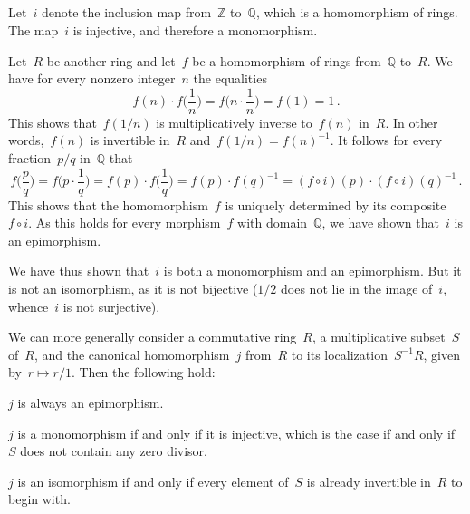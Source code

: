 \subsection{}

Let~$i$ denote the inclusion map from~$ℤ$ to~$ℚ$, which is a homomorphism of rings.
The map~$i$ is injective, and therefore a monomorphism.

Let~$R$ be another ring and let~$f$ be a homomorphism of rings from~$ℚ$ to~$R$.
We have for every nonzero integer~$n$ the equalities
\[
	f(n) ⋅ f\biggl( \frac{1}{n} \biggr)
	= f\biggl( n ⋅\frac{1}{n} \biggr)
	= f(1)
	= 1 \,.
\]
This shows that~$f(1/n)$ is multiplicatively inverse to~$f(n)$ in~$R$.
In other words,~$f(n)$ is invertible in~$R$ and~$f(1 / n) = f(n)^{-1}$.
It follows for every fraction~$p / q$ in~$ℚ$ that
\[
	f\biggl( \frac{p}{q} \biggr)
	= f\biggl( p ⋅ \frac{1}{q} \biggr)
	= f(p) ⋅ f\biggl( \frac{1}{q} \biggr)
	= f(p) ⋅ f(q)^{-1}
	= (f ∘ i)(p) ⋅ (f ∘ i)(q)^{-1} \,.
\]
This shows that the homomorphism~$f$ is uniquely determined by its composite~$f ∘ i$.
As this holds for every morphism~$f$ with domain~$ℚ$, we have shown that~$i$ is an epimorphism.

We have thus shown that~$i$ is both a monomorphism and an epimorphism.
But it is not an isomorphism, as it is not bijective ($1/2$ does not lie in the image of~$i$, whence~$i$ is not surjective).

We can more generally consider a commutative ring~$R$, a multiplicative subset~$S$ of~$R$, and the canonical homomorphism~$j$ from~$R$ to its localization~$S^{-1} R$, given by~$r \mapsto r / 1$.
Then the following hold:
\begin{itemize*}

	\item
		$j$ is always an epimorphism.

	\item
		$j$ is a monomorphism if and only if it is injective, which is the case if and only if~$S$ does not contain any zero divisor.

	\item
		$j$ is an isomorphism if and only if every element of~$S$ is already invertible in~$R$ to begin with.

\end{itemize*}
